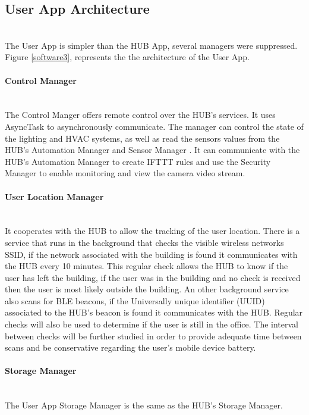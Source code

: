 \subsection{User App Architecture}\mbox{}\\
The User App is simpler than the HUB App, several managers were suppressed. Figure \ref{software3}, represents the the architecture of the User App.

\paragraph{Control Manager}\mbox{}\\
The Control Manger offers remote control over the HUB's services. It uses AsyncTask to asynchronously communicate. The manager can control the state of the lighting and HVAC systems, as well as read the sensors values from the HUB's Automation Manager and Sensor Manager .
It can communicate with the HUB's Automation Manager to create IFTTT rules and use the Security Manager to enable monitoring and view the camera video stream. 

\paragraph{User Location Manager}\mbox{}\\
It cooperates with the HUB to allow the tracking of the user location. There is a service that runs in the background that checks the visible wireless networks SSID, if the network associated with the building is found it communicates with the HUB every 10 minutes. This regular check allows the HUB to know if the user has left the building, if the user was in the building and no check is received then the user is most likely outside the building. 
An other background service also scans for BLE beacons, if the Universally unique identifier (UUID) associated to the HUB's beacon is found it communicates with the HUB. Regular checks will also be used to determine if the user is still in the office. The interval between checks will be further studied in order to provide adequate time between scans and be conservative regarding the user's mobile device battery.

\paragraph{Storage Manager}\mbox{}\\
The User App Storage Manager is the same as the HUB's Storage Manager.


